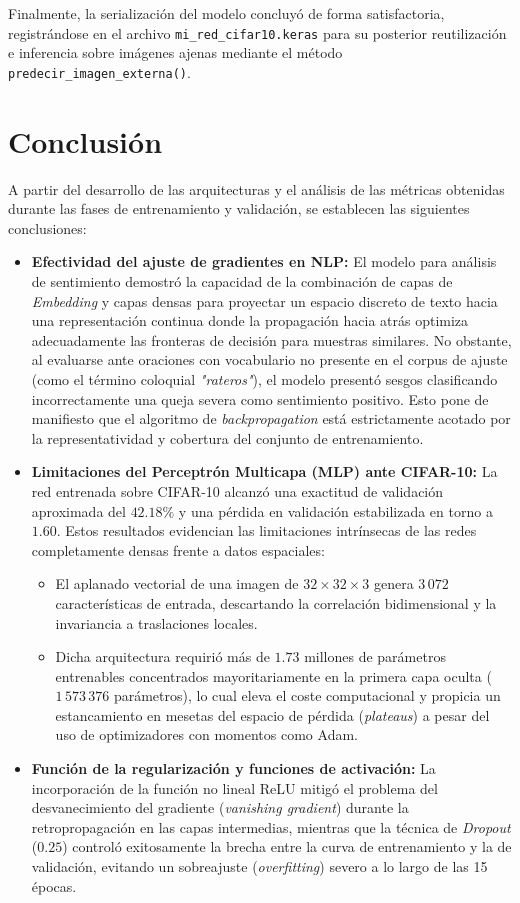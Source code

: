 \documentclass[12pt]{article}
\begin{document}
Finalmente, la serialización del modelo concluyó de forma satisfactoria, registrándose en el archivo \texttt{mi\_red\_cifar10.keras} para su posterior reutilización e inferencia sobre imágenes ajenas mediante el método \texttt{predecir\_imagen\_externa()}.
\newpage
\section{Conclusión}
A partir del desarrollo de las arquitecturas y el análisis de las métricas obtenidas durante las fases de entrenamiento y validación, se establecen las siguientes conclusiones:

\begin{itemize}
	\item \textbf{Efectividad del ajuste de gradientes en NLP:} El modelo para análisis de sentimiento demostró la capacidad de la combinación de capas de \textit{Embedding} y capas densas para proyectar un espacio discreto de texto hacia una representación continua donde la propagación hacia atrás optimiza adecuadamente las fronteras de decisión para muestras similares. No obstante, al evaluarse ante oraciones con vocabulario no presente en el corpus de ajuste (como el término coloquial \textit{"rateros"}), el modelo presentó sesgos clasificando incorrectamente una queja severa como sentimiento positivo. Esto pone de manifiesto que el algoritmo de \textit{backpropagation} está estrictamente acotado por la representatividad y cobertura del conjunto de entrenamiento.
	
	\item \textbf{Limitaciones del Perceptrón Multicapa (MLP) ante CIFAR-10:} La red entrenada sobre CIFAR-10 alcanzó una exactitud de validación aproximada del $42.18\%$ y una pérdida en validación estabilizada en torno a $1.60$. Estos resultados evidencian las limitaciones intrínsecas de las redes completamente densas frente a datos espaciales:
	\begin{itemize}
		\item El aplanado vectorial de una imagen de $32\times 32\times 3$ genera $3\,072$ características de entrada, descartando la correlación bidimensional y la invariancia a traslaciones locales.
		\item Dicha arquitectura requirió más de $1.73$ millones de parámetros entrenables concentrados mayoritariamente en la primera capa oculta ($1\,573\,376$ parámetros), lo cual eleva el coste computacional y propicia un estancamiento en mesetas del espacio de pérdida (\textit{plateaus}) a pesar del uso de optimizadores con momentos como Adam.
	\end{itemize}
	
	\item \textbf{Función de la regularización y funciones de activación:} La incorporación de la función no lineal ReLU mitigó el problema del desvanecimiento del gradiente (\textit{vanishing gradient}) durante la retropropagación en las capas intermedias, mientras que la técnica de \textit{Dropout} ($0.25$) controló exitosamente la brecha entre la curva de entrenamiento y la de validación, evitando un sobreajuste (\textit{overfitting}) severo a lo largo de las 15 épocas.
\end{itemize}
\end{document}

